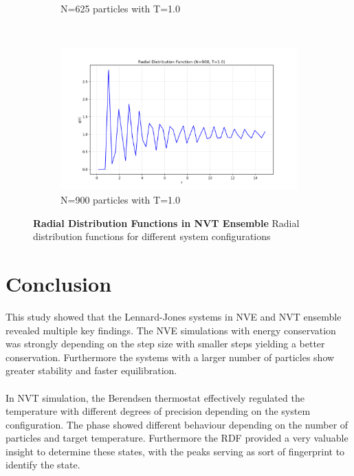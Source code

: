 \begin{figure}[H]
\begin{subfigure}{0.5\textwidth}
		\caption{N=625 particles with T=1.0}
		\label{sfig:nvt_rdf_N625_T10}
	\end{subfigure}%
	~
	\begin{subfigure}{0.5\textwidth}
		\includegraphics[width=\textwidth]{media/rdf_N900_T1.0.png}
		\caption{N=900 particles with T=1.0}
		\label{sfig:nvt_rdf_N900_T10}
	\end{subfigure}%
	\caption{\textbf{Radial Distribution Functions in NVT Ensemble}
		Radial distribution functions for different system configurations}
	\label{fig:nvt_rdf}
\end{figure}

\section*{Conclusion}
This study showed that the Lennard-Jones systems in NVE and NVT ensemble revealed multiple key findings. The NVE simulations with energy conservation was strongly depending on the step size with smaller steps yielding a better conservation.
Furthermore the systems with a larger number of particles show greater stability and faster equilibration.\\
\\
In NVT simulation, the Berendsen thermostat effectively regulated the temperature with different degrees of precision depending on the system configuration. The phase showed different behaviour depending on the number of particles and target temperature. Furthermore the RDF provided a very valuable insight to determine these states, with the peaks serving as sort of fingerprint to identify the state.

